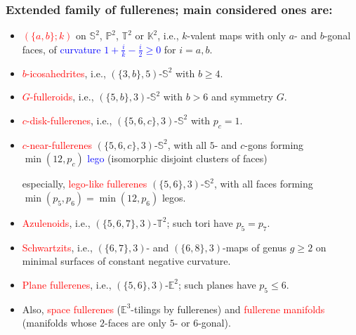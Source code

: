 \documentclass{beamer}
\begin{document}
\begin{frame}\frametitle{Extended family 
of fullerenes; main considered ones are:}
\vspace{-3mm}
\begin{itemize}
\item 

\textcolor{red}{$(\{a, b\}; k)$} on $\mathbb{S}^2$,  $\mathbb{P}^2$, $\mathbb{T}^2$ or $\mathbb{K}^2$, i.e., $k$-valent maps
with  only $a$- and $b$-gonal faces, of \textcolor{blue}{curvature $1+\frac{i}{k}-\frac{i}{2} 
 \ge 0$} for $i=a,b$.

\item  \textcolor{red}{$b$-icosahedrites}, i.e., $(\{3, b\}, 5)$-$\mathbb{S}^2$ with $b $$\ge $$4$. 
\item  \textcolor{red}{$G$-fulleroids}, i.e., $(\{5, b\}, 3)$-$\mathbb{S}^2$ with $b $$> $$6$ and symmetry $G$.

\item  \textcolor{red}{$c$-disk-fullerenes}, i.e.,   $(\{5, 6, c\}, 3)$-$\mathbb{S}^2$ with $p_c=1$.

\item  \textcolor{red}{$c$-near-fullerenes} $(\{5, 6, c\}, 3)$-$\mathbb{S}^2$, 
 with all $5$- and $c$-gons forming $\min (12,p_c)$ \textcolor{blue}{lego}  
 (isomorphic  disjoint clusters of faces)
 
 especially,  \textcolor{red}{lego-like fullerenes} $(\{5, 6\}, 3)$-$\mathbb{S}^2$, 
 with all faces forming $\min (p_5,p_6)= \min (12,p_6)$ %
 legos. 


\item \textcolor{red}{Azulenoids}, i.e., $(\{5,6,7\},3)$-$\mathbb{T}^2$; such tori have $p_5 = p_7$.
\item \textcolor{red}{Schwartzits}, i.e., $(\{ 6, 7\}, 3)$- and 
$(\{ 6, 8\}, 3)$-maps of genus $g \ge 2$
on minimal surfaces of constant negative curvature.
\item \textcolor{red}{Plane fullerenes}, i.e., 
 $(\{5, 6\}, 3)$-$\mathbb{E}^2$; such planes have $p_5\le 6$. 
 
\item Also, \textcolor{red}{space fullerenes} ($\mathbb{E}^3$-tilings by fullerenes) and
\textcolor{red}{fullerene manifolds} (manifolds whose
$2$-faces are only  $5$- or $6$-gonal).

\end{itemize} 
\end{frame}
\end{document}
